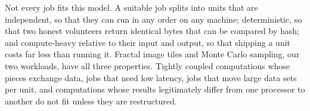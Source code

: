 Not every job fits this model. A suitable job splits into units that are independent, so that they can run in any order on any machine; deterministic, so that two honest volunteers return identical bytes that can be compared by hash; and compute-heavy relative to their input and output, so that shipping a unit costs far less than running it. Fractal image tiles and Monte Carlo sampling, our two workloads, have all three properties. Tightly coupled computations whose pieces exchange data, jobs that need low latency, jobs that move large data sets per unit, and computations whose results legitimately differ from one processor to another do not fit unless they are restructured.

